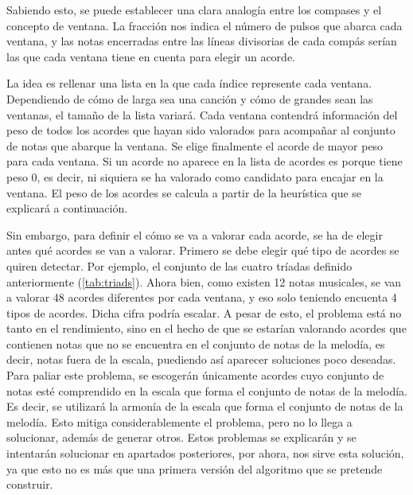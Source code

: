     Sabiendo esto, se puede establecer una clara analogía entre los compases y el concepto de ventana. La fracción nos indica el número de pulsos que abarca cada ventana, y las notas encerradas entre las líneas divisorias de cada compás serían las que cada ventana tiene en cuenta para elegir un acorde. 

    La idea es rellenar una lista en la que cada índice represente cada ventana. Dependiendo de cómo de larga sea una canción y cómo de grandes sean las ventanas, el tamaño de la lista variará. Cada ventana contendrá información del peso de todos los acordes que hayan sido valorados para acompañar al conjunto de notas que abarque la ventana. Se elige finalmente el acorde de mayor peso para cada ventana. Si un acorde no aparece en la lista de acordes es porque tiene peso 0, es decir, ni siquiera se ha valorado como candidato para encajar en la ventana. El peso de los acordes se calcula a partir de la heurística que se explicará a continuación.

    \label{arm:problema_acordes}
    Sin embargo, para definir el cómo se va a valorar cada acorde, se ha de elegir antes qué acordes se van a valorar. Primero se debe elegir qué tipo de acordes se quiren detectar. Por ejemplo, el conjunto de las cuatro tríadas definido anteriormente (\ref{tab:triads}). Ahora bien, como existen 12 notas musicales, se van a valorar 48 acordes diferentes por cada ventana, y eso solo teniendo encuenta 4 tipos de acordes. Dicha cifra podría escalar. A pesar de esto, el problema está no tanto en el rendimiento, sino en el hecho de que se estarían valorando acordes que contienen notas que no se encuentra en el conjunto de notas de la melodía, es decir, notas fuera de la escala, puediendo así aparecer soluciones poco deseadas. Para paliar este problema, se escogerán únicamente acordes cuyo conjunto de notas esté comprendido en la escala que forma el conjunto de notas de la melodía. Es decir, se utilizará la armonía de la escala que forma el conjunto de notas de la melodía. Esto mitiga considerablemente el problema, pero no lo llega a solucionar, además de generar otros. Estos problemas se explicarán y se intentarán solucionar en apartados posteriores, por ahora, nos sirve esta solución, ya que esto no es más que una primera versión del algoritmo que se pretende construir.

